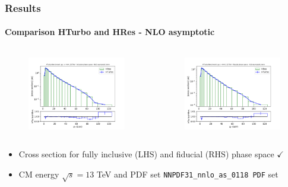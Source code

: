 \documentclass[aspectratio=43]{beamer}
\begin{document}
\begin{frame}
	
	\frametitle{Results}
	\framesubtitle{Comparison HTurbo and HRes - NLO asymptotic}

	\footnotesize
	
	\begin{columns}
		
		
		\begin{figure}
			\includegraphics[width = 7cm]{plots/part3/chapter6/nnlo-ct-1.png}
		\end{figure}
		
		
		\begin{figure}
			\includegraphics[width = 7cm]{plots/part3/chapter6/nnlo-ct-fid-1.png}
		\end{figure}
		
	\end{columns}
	
	\begin{itemize}
		\item Cross section for fully inclusive (LHS) and fiducial (RHS) phase space {\color{darkgreen}$\checkmark$} 
		\item CM energy $\sqrt s = 13$ TeV and PDF set \texttt{NNPDF31\_nnlo\_as\_0118 PDF} set
	\end{itemize}

\end{frame}
\end{document}
